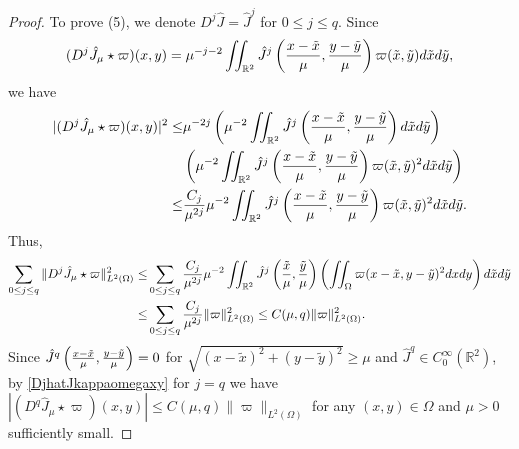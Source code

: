 \documentclass[1 [leqno, 11pt]{amsart}
\numberwithin{equation}{section}
\begin{document}
\begin{CJK*}{GBK}{song}
\begin{appendix}
\begin{proof}
To  prove (5), we
 denote $D^j\hat J=\hat J^j$ for  $0\leq j\leq q$. Since
\begin{align*}
(D^j\hat J_{\mu}\star\varpi)(x,y)=\mu^{-j-2}\iint_{\mathbb{R}^2}\hat J^j\left({x-\tilde x\over \mu},{y-\tilde y\over \mu}\right)\varpi(\tilde x,\tilde y)d\tilde x d\tilde y,
\end{align*}
we have
\begin{align}\nonumber
|(D^j\hat J_{\mu}\star\varpi)(x,y)|^2
\leq &\mu^{-2j}\left(\mu^{-2}\iint_{\mathbb{R}^2}\hat J^j\left({x-\tilde x\over \mu},{y-\tilde y\over \mu}\right)d\tilde x d\tilde y\right)\\\nonumber
&\left(\mu^{-2}\iint_{\mathbb{R}^2}\hat J^j\left({x-\tilde x\over \mu},{y-\tilde y\over \mu}\right)\varpi(\tilde x,\tilde y)^2d\tilde xd\tilde y\right)\\\label{DjhatJkappaomegaxy}
\leq &{C_j\over \mu^{2j}}\mu^{-2}\iint_{\mathbb{R}^2}\hat J^j\left({x-\tilde x\over \mu},{y-\tilde y\over \mu}\right)\varpi(\tilde x,\tilde y)^2d\tilde xd\tilde y.
\end{align}
Thus,
\begin{align*}
\sum_{0\leq j\leq q}\|D^j\hat J_{\mu}\star\varpi\|_{L^2(\Omega)}^2\leq &\sum_{0\leq j\leq q}{C_j\over \mu^{2j}}\mu^{-2}\iint_{\mathbb{R}^2}\hat J^j\left({\tilde x\over \mu},{\tilde y\over \mu}\right)\left(\iint_\Omega\varpi(x-\tilde x,y-\tilde y)^2dxdy\right)d\tilde x d\tilde y\\
\leq &\sum_{0\leq j\leq q}{C_j\over \mu^{2j}}\|\varpi\|_{L^2(\Omega)}^2\leq C(\mu,q)\|\varpi\|_{L^2(\Omega)}^2.
\end{align*}
Since $\hat J^{q}\left({x-\tilde x\over \mu},{y-\tilde y\over \mu}\right)=0$ for $\sqrt{(x-\tilde x)^2+(y-\tilde y)^2}\geq\mu$ and $\hat J^{q}\in C_0^\infty(\mathbb{R}^2)$, by \eqref{DjhatJkappaomegaxy} for $j=q$ we have
$|(D^q\hat J_{\mu}\star\varpi)(x,y)|
\leq C(\mu,q)\|\varpi\|_{L^2(\Omega)}$ for any $(x,y)\in\Omega$ and $\mu>0$ sufficiently small.


\end{proof}
\end{appendix}
\end{CJK*}
\end{document}
